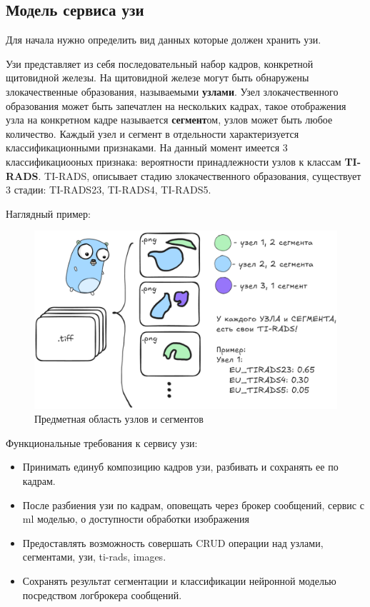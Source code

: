 \subsection{Модель сервиса узи}
Для начала нужно определить вид данных которые должен хранить узи.

Узи представляет из себя последовательный набор кадров, конкретной щитовидной железы. На щитовидной
железе могут быть обнаружены злокачественные образования, называемыми \textbf{узлами}. Узел злокачественного образования
может быть запечатлен на нескольких кадрах, такое отображения узла на конкретном кадре называется \textbf{сегмент}ом,
узлов может быть любое количество. Каждый узел и сегмент в отдельности характеризуется классификационными признаками.
На данный момент имеется 3 классификациооных признака: вероятности принадлежности узлов к классам \textbf{TI-RADS}.
TI-RADS, описывает стадию злокачественного образования, существует 3 стадии: TI-RADS23, TI-RADS4, TI-RADS5.


Наглядный пример:
\begin{figure}[H]%
	\begin{center}
		\includegraphics[width=.8\columnwidth]{./img/nodes_segments_info.png}%
	\end{center}
	\caption{Предметная область узлов и сегментов}%
	\label{pic:auth_db}%
\end{figure}

Функциональные требования к сервису узи:
\begin{itemize}
  \item Принимать единуб композицию кадров узи, разбивать и сохранять ее по кадрам.
  \item После разбиения узи по кадрам, оповещать через брокер сообщений, сервис с ml моделью, о доступности обработки изображения
  \item Предоставлять возможность совершать CRUD операции над узлами, сегментами, узи, ti-rads, images.
  \item Сохранять результат сегментации и классификации нейронной моделью посредством логброкера сообщений.
\end{itemize}


